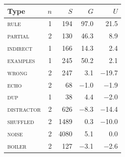 \begin{tabular}{@{}lrrrr@{}}
\toprule
Type & $n$ & $S$ & $G$ & $U$ \\
\midrule
\textsc{rule} & 1 & 194 & 97.0 & 21.5 \\
\textsc{partial} & 2 & 130 & 46.3 & 8.9 \\
\textsc{indirect} & 1 & 166 & 14.3 & 2.4 \\
\textsc{examples} & 1 & 245 & 50.2 & 2.1 \\
\midrule
\textsc{wrong} & 2 & 247 & 3.1 & \ensuremath{-}19.7 \\
\textsc{echo} & 2 & 68 & \ensuremath{-}1.0 & \ensuremath{-}1.9 \\
\textsc{dup} & 1 & 38 & 4.4 & \ensuremath{-}2.0 \\
\textsc{distractor} & 2 & 626 & \ensuremath{-}8.3 & \ensuremath{-}14.4 \\
\textsc{shuffled} & 2 & 1489 & 0.3 & \ensuremath{-}10.0 \\
\textsc{noise} & 2 & 4080 & 5.1 & 0.0 \\
\textsc{boiler} & 2 & 127 & \ensuremath{-}3.1 & \ensuremath{-}2.6 \\
\bottomrule
\end{tabular}

